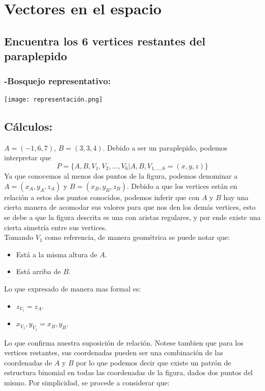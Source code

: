\documentclass[letterpaper, 12pt]{article}
\begin{document}
\setcounter{page}{1}
\thispagestyle{fancy}
\section{Vectores en el espacio}
\subsection*{Encuentra los 6 vertices restantes del paraplepido}
\subsubsection*{-Bosquejo representativo:}
\centering
\texttt{[image: representación.png]}
\justify
\subsection*{Cálculos:}
\justify
\(A=(-1,6,7),\,B=(3,3,4)\). Debido a ser un paraplepido, podemos interpretar que 
\[P=\{A,B,V_1,V_2,...,V_6|A,B,V_{1,...,6}=(x,y,z)\}\]
Ya que conocemos al menos dos puntos de la figura, podemos denominar a \(A=(x_A,y_A,z_A)\) y \(B=(x_B,y_B,z_B)\). Debido a que los vertices están en relación
a estos dos puntos conocidos, podemos inferir que con \(A\) y \(B\) hay una cierta manera de acomodar sus valores para que nos den los demás vertices, esto se debe a que la figura descrita
es una con aristas regulares, y por ende existe una cierta simetría entre sus vertices. 
\\ \newline
Tomando \(V_1\) como referencia, de manera geométrica se puede notar que:
\begin{itemize}
    \item Está a la misma altura de \(A\).
    \item Está arriba de \(B\).
\end{itemize}
Lo que expresado de manera mas formal es:
\begin{itemize}
    \item \(z_{V_1}=z_A\).
    \item \(x_{V_1},y_{V_1}=x_B,y_B\).
\end{itemize}
Lo que confirma nuestra suposición de relación. Notese tambien que para los vertices restantes, sus coordenadas pueden ser una combinación de las coordenadas de \(A\) y \(B\) por lo que podemos
decir que existe un patrón de estructura binomial en todas las coordenadas de la figura, dados dos puntos del mismo. Por simplicidad, se procede a considerar que:
\end{document}
